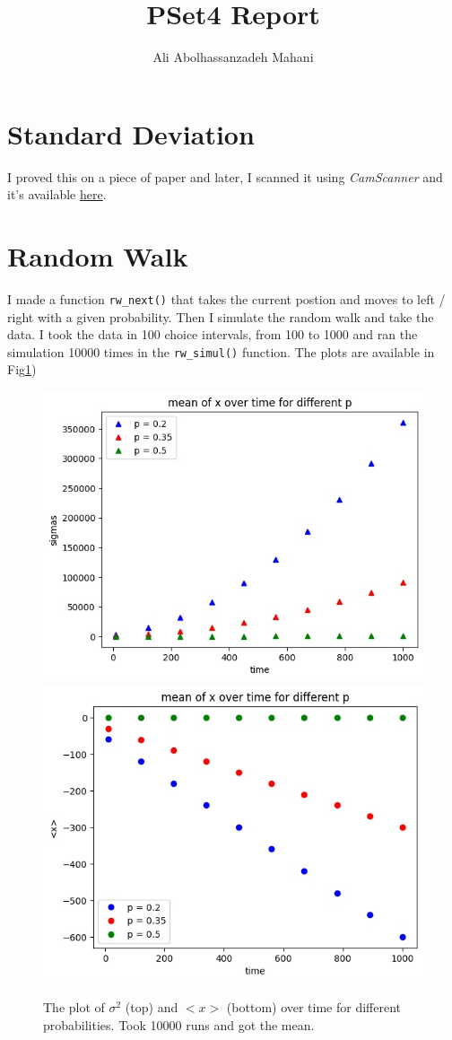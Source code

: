 \documentclass[12pt]{article}
\title{PSet4 Report}
\author{Ali Abolhassanzadeh Mahani}
\begin{document}
	\maketitle
	\section{Standard Deviation}
	I proved this on a piece of paper and later, I scanned it using \emph{CamScanner} and it's available   \href{run:d:/../CompPhys4.pdf}{here}.
	\section{Random Walk}
	I made a function \texttt{rw\_next()} that takes the current postion and moves to left / right 
	with a given probability.
	Then I simulate the random walk and take the data. I took the data in 100 choice intervals, from
	100 to 1000 and ran the simulation 10000 times in the \texttt{rw\_simul()} function.
	The plots are available in Fig\ref{fig:rw_sim})
	\begin{figure}[h!]
		\centering
		\includegraphics[width=0.9\linewidth]{../p2/sigmas.jpg}
		\includegraphics[width=0.9\linewidth]{../p2/x_means.jpg}
		\label{fig:rw_sim}
		\caption{The plot of $\sigma^2$ (top) and $<x>$ (bottom) over time for different probabilities. Took 10000 runs and got the mean.}
	\end{figure} 
\end{document}
